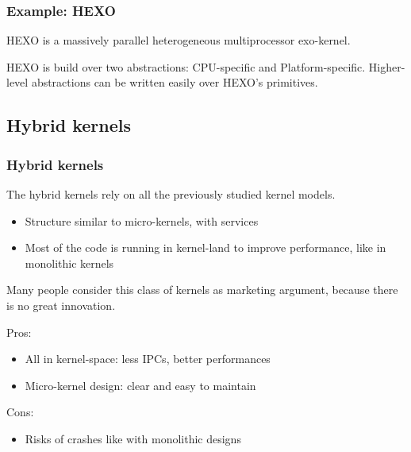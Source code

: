 %
%

\begin{frame}
  \frametitle{Example: HEXO}

  HEXO is a massively parallel heterogeneous multiprocessor exo-kernel.

  \begin{center}
  \end{center}

  HEXO is build over two abstractions: CPU-specific and
  Platform-specific. Higher-level abstractions can be written easily over HEXO's primitives.

\end{frame}

%
%

\subsection{Hybrid kernels}

%
%

\begin{frame}
  \frametitle{Hybrid kernels}

  The hybrid kernels rely on all the previously studied kernel models.

  \begin{itemize}
  \item
    Structure similar to micro-kernels, with services
  \item
    Most of the code is running in kernel-land to improve performance, like in monolithic kernels
  \end{itemize}

  Many people consider this class of kernels as marketing argument, because there is no great innovation.

  \-

  Pros:

  \begin{itemize}
  \item
    All in kernel-space: less IPCs, better performances
  \item
    Micro-kernel design: clear and easy to maintain
  \end{itemize}

  \-

  Cons:

  \begin{itemize}
  \item
    Risks of crashes like with monolithic designs
  \end{itemize}

\end{frame}

